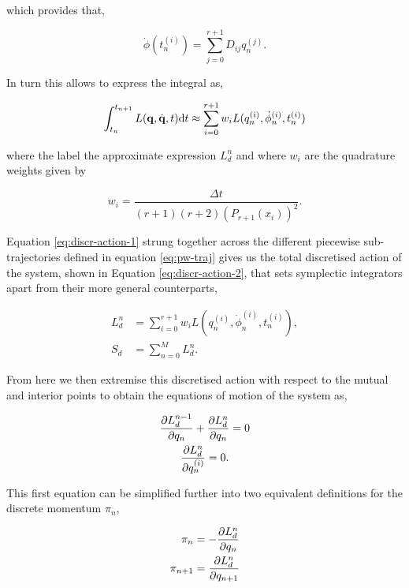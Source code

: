 which provides that,

\begin{equation}
  \dot\phi(t_n^{(i)}) = \sum_{j = 0}^{r + 1} D_{ij}q_n^{(j)}.
\end{equation}

In turn this allows to express the integral as,

\begin{equation}
\label{eq:discr-action-1}
  \int_{t_n}^{t_{n + 1}} L(\vb q, \dot{\vb q}, t) \dd t \approx \sum_{i = 0}^{r + 1} w_i L(q_{n}^{(i)}, \dot\phi_{n}^{(i)}, t_{n}^{(i)})
\end{equation}

where the label the approximate expression $L_d^n$ and where $w_i$ are the quadrature weights given by

\begin{equation}
  w_i = \frac{\Delta t}{(r + 1)(r + 2)(P_{r + 1}(x_i))^2}.
\end{equation}

Equation \eqref{eq:discr-action-1} strung together across the different piecewise sub-trajectories defined in equation \eqref{eq:pw-traj} gives us the total discretised action of the system, shown in Equation \eqref{eq:discr-action-2}, that sets symplectic integrators apart from their more general counterparts,

\begin{align}
\label{eq:ldn}
L_d^n &= \sum_{i = 0}^{r + 1} w_i L(q_{n}^{(i)}, \dot\phi_{n}^{(i)}, t_{n}^{(i)}), \\
\label{eq:discr-action-2}
  S_d &= \sum_{n = 0}^{M} L_d^n.
\end{align}

From here we then extremise this discretised action with respect to the mutual and interior points to obtain the equations of motion of the system as,

\begin{gather}
	\frac{\partial L_d^{n-1}}{\partial q_n} + \frac{\partial L_d^{n}}{\partial q_n} = 0 \\
	\label{eq:Ld-interior-eom} \frac{\partial L_d^{n}}{\partial q^{(i)}_n} = 0.
\end{gather}

This first equation can be simplified further into two equivalent definitions for the discrete momentum \(\pi_n\),

\begin{align}
	\label{eq:pi-n} \pi_n &= -\frac{\partial L_d^{n}}{\partial q_n} \\
	\label{eq:pi-n+1} \pi_{n + 1} &= \frac{\partial L_d^{n}}{\partial q_{n + 1}}
\end{align}

